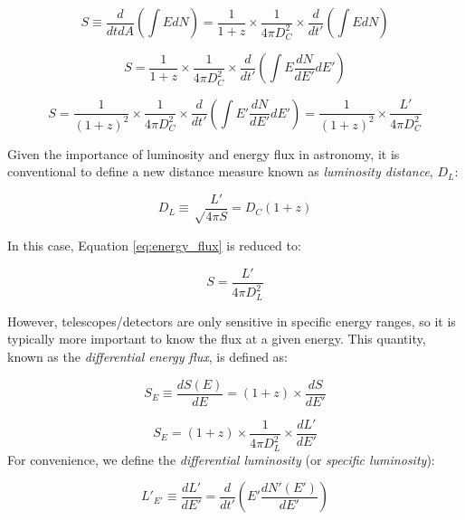 \begin{equation}
S \equiv \frac{d}{dtdA} \left( \int E dN \right) = \frac{1}{1+z} \times \frac{1}{4 \pi D_{C}^{2}} \times \frac{d}{dt'} \left( \int E dN \right)
\end{equation}

\begin{equation}
S = \frac{1}{1+z} \times \frac{1}{4 \pi D_{C}^{2}} \times \frac{d}{dt'} \left( \int E \frac{dN}{dE'} dE' \right)
\end{equation}

\begin{equation}
S = \frac{1}{(1+z)^{2}} \times \frac{1}{4 \pi D_{C}^{2}} \times \frac{d}{dt'} \left( \int E' \frac{dN}{dE'} dE' \right) =  \frac{1}{(1+z)^{2}} \times \frac{L'}{4 \pi D_{C}^{2}}
\label{eq:energy_flux}
\end{equation}

Given the importance of luminosity and energy flux in astronomy, it is conventional to define a new distance measure known as \emph{luminosity distance}, $D_{L}$:

\begin{equation}
D_{L} \equiv \sqrt\frac{L'}{4 \pi S} = D_{C}(1+z)
\end{equation}

In this case, Equation \ref{eq:energy_flux} is reduced to:

\begin{equation}
S = \frac{L'}{4 \pi D_{L}^{2}}
\end{equation}

However, telescopes/detectors are only sensitive in specific energy ranges, so it is typically more important to know the flux at a given energy. This quantity, known as the \emph{differential energy flux}, is defined as:

\begin{equation}
S_{E} \equiv \frac{dS(E)}{dE} = (1+z) \times \frac{dS}{dE'}
\end{equation}

\begin{equation}
S_{E} = (1+z) \times \frac{1}{4 \pi D_{L}^{2}} \times \frac{dL'}{dE'}
\end{equation}
For convenience, we define the \emph{differential luminosity} (or \emph{specific luminosity}):

\begin{equation}
L'_{E'} \equiv  \frac{dL'}{dE'} = \frac{d}{dt'} \left( E' \frac{dN'(E')}{dE'} \right)
\end{equation}

